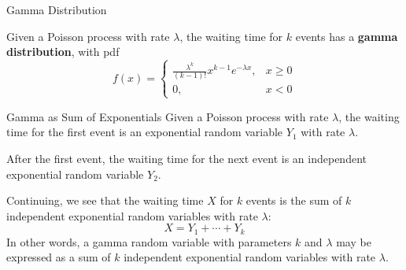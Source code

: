 \documentclass[handout]{beamer}
\renewcommand{\emph}{\textbf}
\begin{document}
\begin{frame}{Gamma Distribution}
\begin{block}{}
Given a Poisson process with rate $\lambda$, the waiting time for $k$ events has a \emph{gamma distribution}, with pdf
$$f(x) =\begin{cases} \frac{\lambda^k}{(k-1)!}x^{k-1}e^{-\lambda x}, & x\geq 0 \\ 0, & x<0\end{cases}$$
\end{block}

\vspace{.2cm}

\end{frame}

\begin{frame}{Gamma as Sum of Exponentials}
Given a Poisson process with rate $\lambda$, the waiting time for the first event is an exponential random variable $Y_1$ with rate $\lambda$. 

\vspace{.2cm}
\pause
After the first event, the waiting time for the next event is an independent exponential random variable $Y_2$.

\vspace{.2cm}
\pause
Continuing, we see that the waiting time $X$ for $k$ events is the sum of $k$ independent exponential random variables with rate $\lambda$:
$$X=Y_1+\cdots+Y_k$$
\pause In other words, a gamma random variable with parameters $k$ and $\lambda$ may be expressed as a sum of $k$ independent exponential random variables with rate $\lambda$.
\end{frame}
\end{document}
